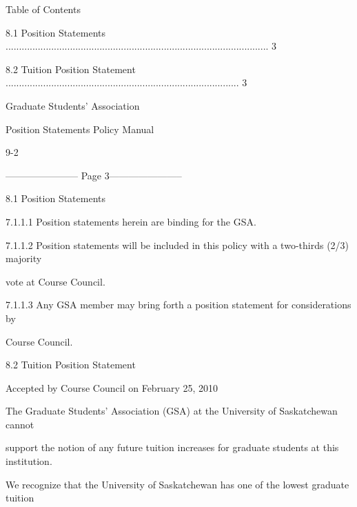                                           Table of Contents  



 8.1     Position Statements .................................................................................................. 3  



 8.2     Tuition Position Statement ....................................................................................... 3  



  



                                        Graduate Students’ Association  



                                     Position Statements Policy Manual  



                                                            9-2  


----------------------- Page 3-----------------------

                             8.1      Position Statements  



7.1.1.1 Position statements herein are binding for the GSA.  



7.1.1.2 Position statements will be included in this policy with a two-thirds (2/3) majority  

         vote at Course Council.   



7.1.1.3 Any  GSA  member  may  bring  forth  a  position  statement  for  considerations  by  

         Course Council.  



                       8.2      Tuition Position Statement  



Accepted by Course Council on February 25, 2010  



The  Graduate  Students’  Association  (GSA)  at  the  University  of  Saskatchewan  cannot  

support the notion of any future tuition increases for graduate students at this institution.  

We recognize that the University of Saskatchewan has one of the lowest graduate tuition  

